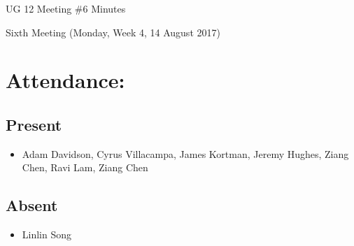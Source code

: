 \documentclass{article}
\begin{document}
\begin{adjustwidth}{2.5em}{0pt}
\begin{center}
\Large{UG 12 Meeting \#6 Minutes}\\
\end{center}
\end{adjustwidth}
\justify

Sixth Meeting (Monday, Week 4, 14 August 2017)
\section{Attendance:}
\subsection*{Present}
\begin{itemize}
\item Adam Davidson, Cyrus Villacampa, James Kortman, Jeremy Hughes, Ziang Chen, Ravi Lam, Ziang Chen
\end{itemize}
\subsection*{Absent}
\begin{itemize}
\item Linlin Song
\end {itemize}
\end{document}
